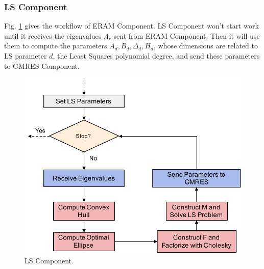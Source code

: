 \subsubsection{LS Component}

Fig. \ref{ls-component} gives the workflow of ERAM Component. LS Component won't start work until it receives the eigenvalues $\Lambda_r$ sent from ERAM Component. Then it will use them to compute the parameters $A_d, B_d, \Delta_d, H_d$, whose dimensions are related to LS parameter $d$, the Least Squares polynomial degree, and send these parameters to GMRES Component.

\begin{figure}[htbp]
	\centering
	\includegraphics[width=4.8in]{fig/LS-component.pdf}
	\caption{LS Component.}
	\label{ls-component}
\end{figure}


